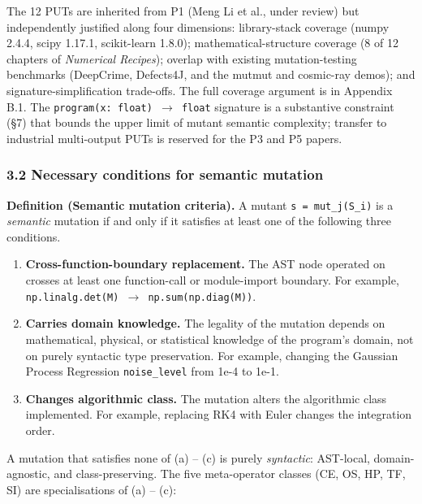 \documentclass[review,12pt,authoryear]{elsarticle}
\newcounter{none}                   %
\begin{document}
The 12 PUTs are inherited from P1 (Meng Li et al., under review) but
independently justified along four dimensions: library-stack coverage
(numpy 2.4.4, scipy 1.17.1, scikit-learn 1.8.0); mathematical-structure
coverage (8 of 12 chapters of \emph{Numerical Recipes}); overlap with
existing mutation-testing benchmarks (DeepCrime, Defects4J, and the
mutmut and cosmic-ray demos); and signature-simplification trade-offs.
The full coverage argument is in Appendix B.1. The
\texttt{program(x:\ float)\ $\to$\ float} signature is a substantive
constraint (§7) that bounds the upper limit of mutant semantic
complexity; transfer to industrial multi-output PUTs is reserved for the
P3 and P5 papers.

\subsubsection{3.2 Necessary conditions for semantic mutation}\label{necessary-conditions-for-semantic-mutation-layer-1}

\textbf{Definition (Semantic mutation criteria).} A mutant
\texttt{s\textquotesingle{}\ =\ mut\_j(S\_i)} is a \emph{semantic}
mutation if and only if it satisfies at least one of the following three
conditions.

\begin{enumerate}
\def\labelenumi{(\alph{enumi})}
\item
  \textbf{Cross-function-boundary replacement.} The AST node operated on
  crosses at least one function-call or module-import boundary. For
  example, \texttt{np.linalg.det(M)\ $\to$\ np.sum(np.diag(M))}.
\item
  \textbf{Carries domain knowledge.} The legality of the mutation
  depends on mathematical, physical, or statistical knowledge of the
  program's domain, not on purely syntactic type preservation. For
  example, changing the Gaussian Process Regression
  \texttt{noise\_level} from 1e-4 to 1e-1.
\item
  \textbf{Changes algorithmic class.} The mutation alters the
  algorithmic class implemented. For example, replacing RK4 with Euler
  changes the integration order.
\end{enumerate}

A mutation that satisfies none of (a) -- (c) is purely \emph{syntactic}:
AST-local, domain-agnostic, and class-preserving. The five meta-operator
classes (CE, OS, HP, TF, SI) are specialisations of (a) -- (c):
\end{document}
